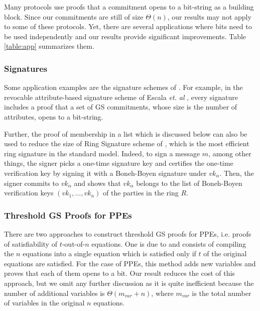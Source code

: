 Many protocols use proofs that a commitment opens to a bit-string as a 
  building block. 
Since our commitments are still of size $\Theta(n)$,
  our results may not apply to some of these protocols. 
Yet, there are several applications where 
  bits need to be used independently and our results provide 
  significant improvements.
Table \ref{table:app} summarizes them.
 
\subsubsection{Signatures} Some application examples are the signature schemes of  \cite{PKC:BFPV11,SCN:BlaPoiVer12,RSA:Camacho13,AFRICACRYPT:EscHerMor11}. For example, in the revocable attribute-based signature scheme of Escala \textit{et. al} \cite{AFRICACRYPT:EscHerMor11}, every signature includes a proof that a set of GS commitments, whose size is the number of attributes, opens to a bit-string. 

Further, the proof of membership in a list which is discussed below can also be used to reduce the size of Ring Signature scheme of  \cite{ICALP:ChaGroSah07}, which is the most efficient ring signature in the standard model. Indeed, to sign a message $m$, among other things, the signer picks a one-time signature key and certifies the one-time verification key by signing it with a Boneh-Boyen signature under $vk_\alpha$. Then, the signer commits to $vk_\alpha$ and shows that $vk_\alpha$ belongs to the list of Boneh-Boyen verification keys $(vk_1,\ldots,vk_n)$ of the parties in the ring $R$. 



\subsubsection{Threshold GS Proofs for PPEs} There are two approaches to construct threshold GS proofs for PPEs, i.e. proofs of satisfiability of $t$-out-of-$n$ equations. One is due to \cite{AC:Groth06} and consists of compiling the $n$ equations into a single equation which is satisfied only if $t$ of the original equations are satisfied. For the case of PPEs, this method adds new variables and proves that each of them opens to a bit.  Our result reduces the cost of this approach, but we omit any further discussion as it is quite inefficient because the number of additional variables is $\Theta(m_{var}+n)$, where $m_{var}$ is the total number of variables in the original $n$ equations.

